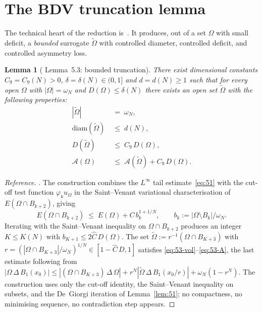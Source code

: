 \documentclass[11pt]{article}
\newtheorem{lemma}[theorem]{Lemma}
\theoremstyle{definition}
\newcommand{\abs}[1]{\left|#1\right|}
\newcommand{\Fr}{\mathcal{A}}
\newcommand{\Om}{\Omega}
\newcommand{\Otilde}{\widetilde{\Omega}}
\begin{document}
\section{The BDV truncation lemma}\label{sec:truncation}

The technical heart of the reduction is~\cite[Lemma~5.3]{BDV}. It
produces, out of a set $\Om$ with small deficit, a \emph{bounded}
surrogate $\Otilde$ with controlled diameter, controlled deficit, and
controlled asymmetry loss.

\begin{lemma}[\cite{BDV} Lemma~5.3: bounded truncation]
\label{lem:53}
There exist dimensional constants $C_{9}=C_{9}(N)>0$,
$\delta=\delta(N)\in(0,1]$ and $d=d(N)\ge 1$ such that for every open
$\Om$ with $|\Om|=\omega_{N}$ and $D(\Om)\le\delta(N)$ there exists an
open set $\Otilde$ with the following properties:
\begin{align}
   \abs{\Otilde}\;&=\;\omega_{N},\label{eq:53-vol}\\
   \mathrm{diam}(\Otilde)\;&\le\;d(N),\label{eq:53-diam}\\
   D(\Otilde)\;&\le\;C_{9}\,D(\Om),\label{eq:53-D}\\
   \Fr(\Om)\;&\le\;\Fr(\Otilde)+C_{9}\,D(\Om).\label{eq:53-A}
\end{align}
\end{lemma}

\begin{proof}[Reference]
\cite[Lemma~5.3]{BDV}. The construction combines the $L^{\infty}$ tail
estimate~\eqref{eq:51} with the cut-off test function
$\varphi_{k}u_{\Om}$ in the Saint--Venant variational characterisation
of $E(\Om\cap B_{k+2})$, giving~\cite[(5.11)]{BDV}
\[
   E(\Om\cap B_{k+2})\;\le\;E(\Om)+C\,b_{k}^{1+1/N},
   \qquad b_{k}:=\abs{\Om\setminus B_{k}}/\omega_{N}.
\]
Iterating with the Saint--Venant inequality on $\Om\cap B_{k+2}$
produces an integer $K\le K(N)$ with $b_{K+1}\le 2\widehat C\,D(\Om)$.
The set $\Otilde:=r^{-1}(\Om\cap B_{K+3})$ with
$r=(|\Om\cap B_{K+3}|/\omega_{N})^{1/N}\in[1-\widehat C\,D,1]$
satisfies \eqref{eq:53-vol}--\eqref{eq:53-A}, the last estimate
following from
$|\Om\,\Delta\,B_{1}(x_{0})|\le
|(\Om\cap B_{K+3})\,\Delta\,\Om|
+r^{N}|\Otilde\,\Delta\,B_{1}(x_{0}/r)|
+\omega_{N}(1-r^{N})$. The construction uses only the cut-off
identity, the Saint--Venant inequality on subsets, and the De~Giorgi
iteration of Lemma~\ref{lem:51}; no compactness, no minimising
sequence, no contradiction step appears.
\end{proof}
\end{document}
